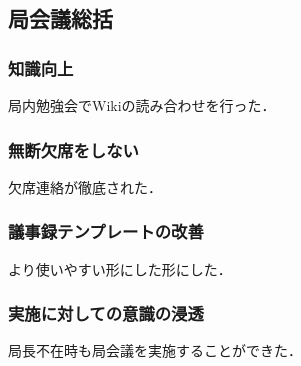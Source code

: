 \subsection*{局会議総括}


\subsubsection*{知識向上}

局内勉強会でWikiの読み合わせを行った．

\subsubsection*{無断欠席をしない}

欠席連絡が徹底された．

\subsubsection*{議事録テンプレートの改善}

より使いやすい形にした形にした．

\subsubsection*{実施に対しての意識の浸透}

局長不在時も局会議を実施することができた．